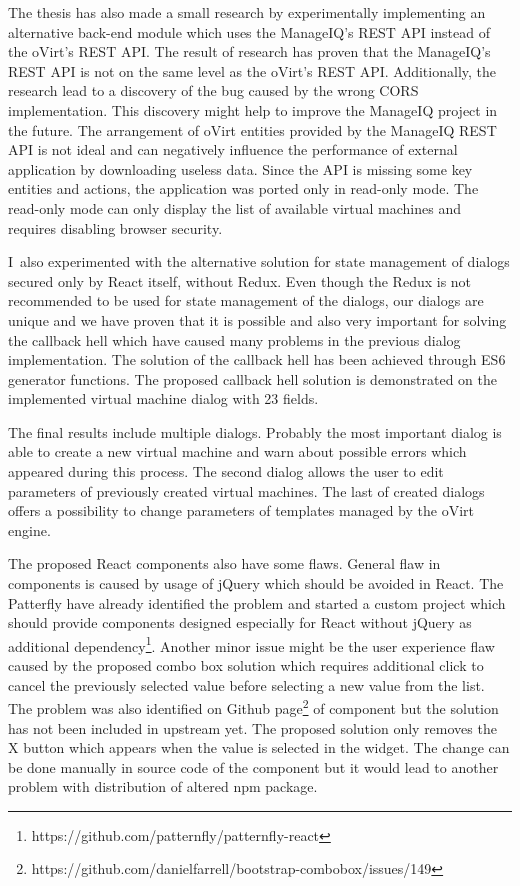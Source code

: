 The thesis has also made a small research by experimentally implementing an alternative back-end module which uses the ManageIQ's REST API instead of the oVirt's REST API. The result of research has proven that the ManageIQ's REST API is not on the same level as the oVirt's REST API. Additionally, the research lead to a discovery of the bug caused by the wrong CORS implementation. This discovery might help to improve the ManageIQ project in the future. The arrangement of oVirt entities provided by the ManageIQ REST API is not ideal and can negatively influence the performance of external application by downloading useless data. Since the API is missing some key entities and actions, the application was ported only in read-only mode. The read-only mode can only display the list of available virtual machines and requires disabling browser security.

I~also experimented with the alternative solution for state management of dialogs secured only by React itself, without Redux. Even though the Redux is not recommended to be used for state management of the dialogs, our dialogs are unique and we have proven that it is possible and also very important for solving the callback hell which have caused many problems in the previous dialog implementation. The solution of the callback hell has been achieved through ES6 generator functions. The proposed callback hell solution is demonstrated on the implemented virtual machine dialog with 23 fields.

The final results include multiple dialogs. Probably the most important dialog is able to create a new virtual machine and warn about possible errors which appeared during this process. The second dialog allows the user to edit parameters of previously created virtual machines. The last of created dialogs offers a possibility to change parameters of templates managed by the oVirt engine.

The proposed React components also have some flaws. General flaw in components is caused by usage of jQuery which should be avoided in React. The Patterfly have already identified the problem and started a custom project which should provide components designed especially for React without jQuery as additional dependency\footnote{https://github.com/patternfly/patternfly-react}. Another minor issue might be the user experience flaw caused by the proposed combo box solution which requires additional click to cancel the previously selected value before selecting a new value from the list. The problem was also identified on Github page\footnote{https://github.com/danielfarrell/bootstrap-combobox/issues/149} of component but the solution has not been included in upstream yet. The proposed solution only removes the X button which appears when the value is selected in the widget. The change can be done manually in source code of the component but it would lead to another problem with distribution of altered npm package.

